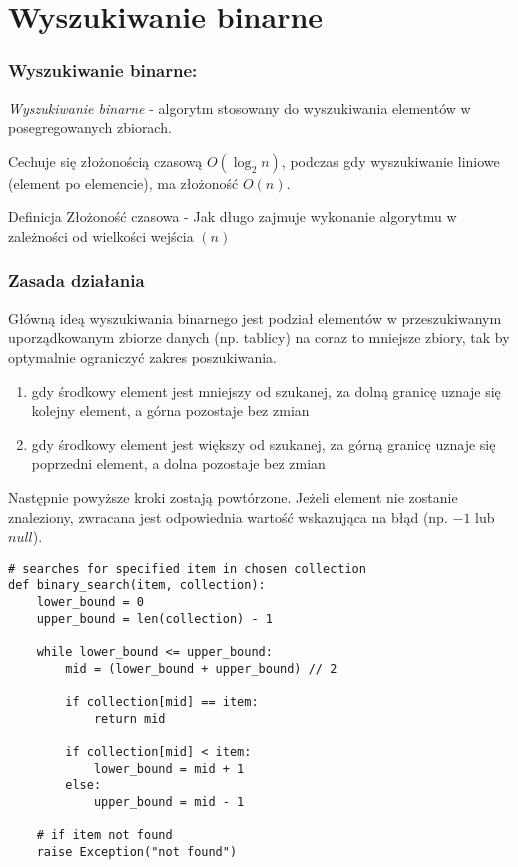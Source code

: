 \documentclass{beamer}
\begin{document}
\section{Wyszukiwanie binarne}
\begin{frame}
    \frametitle{Wyszukiwanie binarne:}
    \emph{Wyszukiwanie binarne} - algorytm stosowany do wyszukiwania
    elementów w posegregowanych zbiorach.

    Cechuje się złożonością czasową $O \left(\log_2 n \right)$, podczas gdy wyszukiwanie liniowe (element po elemencie), ma złożoność $O \left( n \right)$.

    \begin{block}{Definicja}
        Złożoność czasowa - Jak długo zajmuje wykonanie algorytmu w zależności od wielkości wejścia $\left(n\right)$
    \end{block}
\end{frame}
\begin{frame}
    \frametitle{Zasada działania}
    Główną ideą wyszukiwania binarnego jest podział elementów w przeszukiwanym uporządkowanym zbiorze danych
    (np. tablicy) na coraz to mniejsze zbiory, tak by optymalnie ograniczyć zakres poszukiwania.

    \begin{enumerate}
        \item gdy środkowy element jest mniejszy od szukanej, za dolną granicę uznaje się kolejny element, a górna pozostaje bez zmian
        \item gdy środkowy element jest większy od szukanej, za górną granicę uznaje się poprzedni element,
              a dolna pozostaje bez zmian
    \end{enumerate}

    Następnie powyższe kroki zostają powtórzone. Jeżeli element nie zostanie znaleziony,
    zwracana jest odpowiednia wartość wskazująca na błąd (np. $-1$ lub $null$).
\end{frame}
\begin{verbatim}
# searches for specified item in chosen collection
def binary_search(item, collection):
    lower_bound = 0
    upper_bound = len(collection) - 1

    while lower_bound <= upper_bound:
        mid = (lower_bound + upper_bound) // 2

        if collection[mid] == item:
            return mid

        if collection[mid] < item:
            lower_bound = mid + 1
        else:
            upper_bound = mid - 1

    # if item not found
    raise Exception("not found")
    \end{verbatim}
\end{document}
